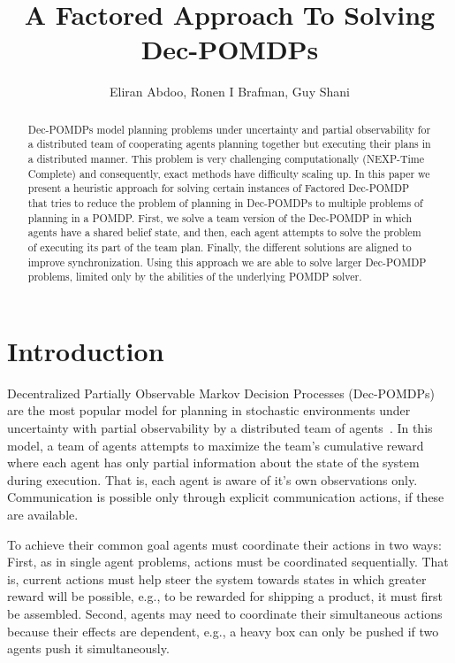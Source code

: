 \documentclass[letterpaper]{article} %
\title{A Factored Approach To Solving Dec-POMDPs }
\author{Eliran Abdoo, Ronen I Brafman, Guy Shani}
\begin{document}
\maketitle

\begin{abstract}
Dec-POMDPs model planning problems under uncertainty and partial observability for a distributed team of cooperating agents planning together but executing their plans in a distributed manner. This problem is
very challenging computationally (NEXP-Time Complete) and consequently, exact methods have difficulty scaling up. In this paper
we present a heuristic approach for solving certain instances of Factored Dec-POMDP that tries to reduce the problem of planning in Dec-POMDPs to multiple
problems of planning in a POMDP. First, we solve a team version of the Dec-POMDP in which agents have a shared belief state, and then, each agent attempts to solve the problem of executing its part of the team plan. Finally, the different solutions are aligned to improve synchronization. Using this approach we are able to solve larger Dec-POMDP problems, limited only by the abilities of the underlying POMDP solver.
\end{abstract}




\section{Introduction}
Decentralized Partially Observable Markov Decision Processes (Dec-POMDPs) are the most popular model for planning in stochastic environments under uncertainty with partial observability by a distributed team of agents~\cite{}. In this model, a team of agents attempts to maximize the team's cumulative reward where each agent has only partial information about the state of the system during execution. That is, each agent is aware of it's own observations only. Communication is possible only through explicit communication actions, if these are available.  

To achieve their common goal agents must coordinate their actions in two ways: First, as in single agent problems, actions must be coordinated sequentially. That is, current actions must help steer the system towards states in which greater reward will be possible,
e.g., to be rewarded for shipping a product, it must first be assembled. 
Second, agents may need to coordinate their simultaneous actions because their effects are dependent, e.g., a heavy box can only be pushed if two agents push it simultaneously. 
\end{document}
